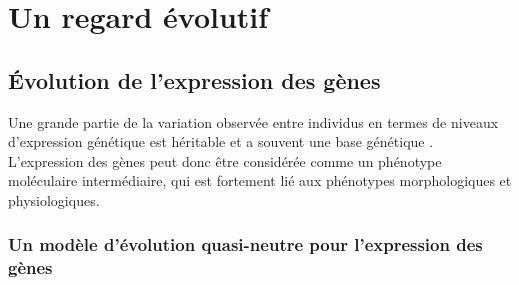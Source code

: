 \chapter{Un regard évolutif}
{\hypersetup{linkcolor=GREYDARK}\minitoc}
\label{chap:evolution}

\section{Évolution de l’expression des gènes}
\label{sec:evolution-gene}

Une grande partie de la variation observée entre individus en termes de niveaux d'expression génétique est héritable et a souvent une base génétique \citep{emilsson_genetics_2008,aguet_genetic_2017}. L’expression des gènes peut donc être considérée comme un phénotype moléculaire intermédiaire, qui est fortement lié aux phénotypes morphologiques et physiologiques.

\subsection{Un modèle d’évolution quasi-neutre pour l’expression des gènes}
\label{subsec:modele-neutre}

